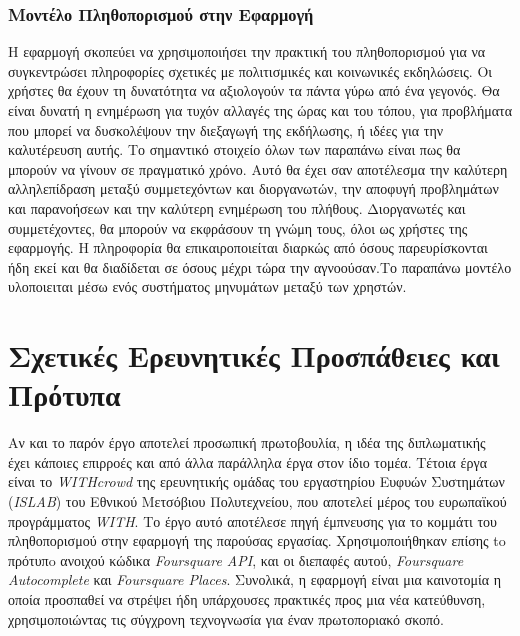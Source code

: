 \subsubsection{Μοντέλο Πληθοπορισμού στην Εφαρμογή}
Η εφαρμογή σκοπεύει να χρησιμοποιήσει την πρακτική του πληθοπορισμού για να συγκεντρώσει πληροφορίες σχετικές με πολιτισμικές και κοινωνικές εκδηλώσεις. Οι χρήστες θα έχουν τη δυνατότητα να αξιολογούν τα πάντα γύρω από ένα γεγονός. Θα είναι δυνατή η ενημέρωση για τυχόν αλλαγές της ώρας και του τόπου, για προβλήματα που μπορεί να δυσκολέψουν την διεξαγωγή της εκδήλωσης, ή ιδέες για την καλυτέρευση αυτής. Το σημαντικό στοιχείο όλων των παραπάνω είναι πως θα μπορούν να γίνουν σε πραγματικό χρόνο. Αυτό θα έχει σαν αποτέλεσμα την καλύτερη αλληλεπίδραση μεταξύ συμμετεχόντων και διοργανωτών, την αποφυγή προβλημάτων και παρανοήσεων και την καλύτερη ενημέρωση του πλήθους. Διοργανωτές και συμμετέχοντες, θα μπορούν να εκφράσουν τη γνώμη τους, όλοι ως χρήστες της εφαρμογής. Η πληροφορία θα επικαιροποιείται διαρκώς από όσους παρευρίσκονται ήδη εκεί και θα διαδίδεται σε όσους μέχρι τώρα την αγνοούσαν.Το παραπάνω μοντέλο υλοποιειται μέσω ενός συστήματος μηνυμάτων μεταξύ των χρηστών. 

\section{Σχετικές Ερευνητικές Προσπάθειες και Πρότυπα}
Αν και το παρόν έργο αποτελεί προσωπική πρωτοβουλία, η ιδέα της διπλωματικής έχει κάποιες επιρροές και από άλλα παράλληλα έργα στον ίδιο τομέα. Τέτοια έργα είναι το \textit{WITHcrowd} της ερευνητικής ομάδας του εργαστηρίου Ευφυών Συστημάτων (\textit{ISLAB}) του Εθνικού Μετσόβιου  Πολυτεχνείου, που αποτελεί μέρος του ευρωπαϊκού προγράμματος \textit{WITH}. Το έργο αυτό αποτέλεσε πηγή έμπνευσης για το κομμάτι του πληθοπορισμού στην εφαρμογή της παρούσας εργασίας. Χρησιμοποιήθηκαν επίσης to πρότυπo ανοιχού κώδικα \textit{Foursquare API}, και οι διεπαφές αυτού,  \textit{Foursquare Autocomplete} και \textit{Foursquare Places}. Συνολικά, η εφαρμογή είναι μια καινοτομία η οποία προσπαθεί να στρέψει ήδη υπάρχουσες πρακτικές προς μια νέα κατεύθυνση, χρησιμοποιώντας τις σύγχρονη τεχνογνωσία για έναν πρωτοποριακό σκοπό.   

